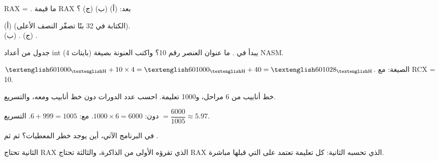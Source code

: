 \begin{tamrin}
    \textenglish{RAX = }. ما قيمة \textenglish{RAX} بعد: (أ)  (ب)  (ج) ؟
\end{tamrin}
\begin{hall}
    (أ)  (الكتابة في 32 بتًا تصفّر النصف الأعلى).\\
    (ب) . \quad (ج) .
\end{hall}

\begin{tamrin}
    جدول من أعداد \textenglish{int} (4 بايتات) يبدأ في . ما عنوان العنصر رقم 10؟ واكتب العنونة بصيغة \textenglish{NASM}.
\end{tamrin}
\begin{hall}
    $\hex{601000} + 10 \times 4 = \hex{601000} + 40 = \hex{601028}$. الصيغة:  مع \textenglish{RCX = 10}.
\end{hall}

\begin{tamrin}
    خط أنابيب من 6 مراحل، و1000 تعليمة. احسب عدد الدورات دون خط أنابيب ومعه، والتسريع.
\end{tamrin}
\begin{hall}
    دون: $1000 \times 6 = 6000$. مع: $6 + 999 = 1005$. التسريع $= \dfrac{6000}{1005} \approx 5.97$.
\end{hall}

\begin{tamrin}
    في البرنامج الآتي، أين يوجد خطر المعطيات؟  ثم  ثم .
\end{tamrin}
\begin{hall}
    الثانية تحتاج \textenglish{RAX} الذي تقرؤه الأولى من الذاكرة، والثالثة تحتاج \textenglish{RAX} الذي تحسبه الثانية: كل
    تعليمة تعتمد على التي قبلها مباشرة.
\end{hall}
